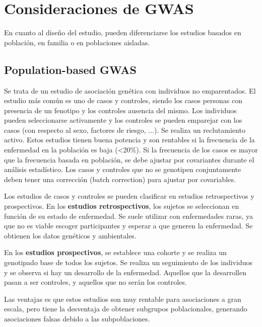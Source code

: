 \section{Consideraciones de GWAS}
En cuanto al diseño del estudio, pueden diferenciarse los estudios basados en población, en familia o en poblaciones aisladas.

\subsection{Population-based GWAS}
Se trata de un estudio de asociación genética con individuos no emparentados. El estudio más común es uno de casos y controles, siendo los casos personas con presencia de un fenotipo y los controles ausencia del mismo. Los individuos pueden seleccionarse activamente y los controles se pueden emparejar con los casos (con respecto al sexo, factores de riesgo, ...). Se realiza un reclutamiento activo. Estos estudios tienen buena potencia y son rentables si la frecuencia de la enfermedad en la población es baja (<20\%). Si la frecuencia de los casos es mayor que la frecuencia basada en población, se debe ajustar por covariantes durante el análisis estadístico. Los casos y controles que no se genotipen conjuntamente deben tener una corrección (batch correction) para ajustar por covariables.

Los estudios de casos y controles se pueden clasificar en estudios retrospectivos y prospectivos. En los \textbf{estudios retrospectivos}, los sujetos se seleccionan en función de su estado de enfermedad. Se suele utilizar con enfermedades raras, ya que no es viable escoger participantes y esperar a que generen la enfermedad. Se obtienen los datos genéticos y ambientales.

En los \textbf{estudios prospectivos}, se establece una cohorte y se realiza un genotipado base de todos los sujetos. Se realiza un seguimiento de los individuos y se observa si hay un desarrollo de la enfermedad. Aquellos que la desarrollen pasan a ser controles, y aquellos que no serán los controles. 

Las ventajas es que estos estudios son muy rentable para asociaciones a gran escala, pero tiene la desventaja de obtener subgrupos poblacionales, generando asociaciones falsas debido a las subpoblaciones.

